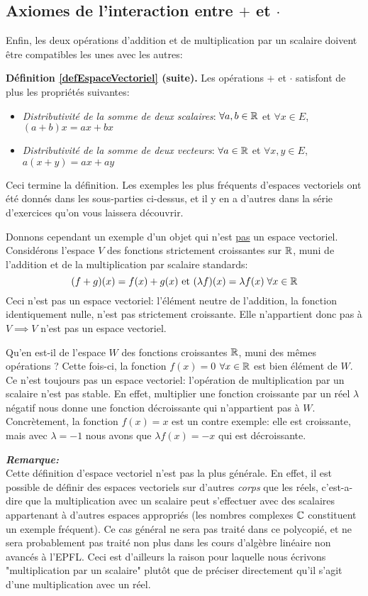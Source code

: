 \subsection{Axiomes de l’interaction entre $+$ et $\cdot$}
Enfin, les deux opérations d'addition et de multiplication par un scalaire doivent être compatibles les unes avec les autres:
\begin{greybox}
\textbf{Définition \ref{defEspaceVectoriel} (suite).} Les opérations $+$ et $\cdot$ satisfont de plus les propriétés suivantes:
\begin{itemize}
    \item \textit{Distributivité de la somme de deux scalaires}: $\forall a,b \in \mathbb{R}$ et $\forall x \in E$, $(a+b)x = ax + bx$
    \item \textit{Distributivité de la somme de deux vecteurs}: $\forall a \in \mathbb{R}$ et $\forall x,y \in E$, $a(x+y) = ax+ay$
\end{itemize}
\end{greybox}

Ceci termine la définition. Les exemples les plus fréquents d'espaces vectoriels ont été donnés dans les sous-parties ci-dessus, et il y en a d'autres dans la série d'exercices qu'on vous laissera découvrir.

Donnons cependant un exemple d'un objet qui n'est \underline{pas} un espace vectoriel. Considérons l'espace $V$ des fonctions strictement croissantes sur $\mathbb{R}$, muni de l'addition et de la multiplication par scalaire standards:
$$(f+g)(x) = f(x) + g(x) \text{ et } (\lambda f)(x) = \lambda f(x) \; \forall x \in \mathbb{R}$$
Ceci n'est pas un espace vectoriel: l'élément neutre de l'addition, la fonction identiquement nulle, n'est pas strictement croissante. Elle n'appartient donc pas à $V \implies V$ n'est pas un espace vectoriel.

Qu'en est-il de l'espace $W$ des fonctions croissantes $\mathbb{R}$, muni des mêmes opérations ? Cette fois-ci, la fonction $f(x) = 0$ $\forall x \in \mathbb{R}$ est bien élément de $W$. Ce n'est toujours pas un espace vectoriel: l'opération de multiplication par un scalaire n'est pas stable. En effet, multiplier une fonction croissante par un réel $\lambda$ négatif nous donne une fonction décroissante qui n'appartient pas à $W$. Concrètement, la fonction $f(x) = x$ est un contre exemple: elle est croissante, mais avec $\lambda = -1$ nous avons que $\lambda f(x) = -x$ qui est décroissante.

\textit{\textbf{Remarque:}} \\
Cette définition d'espace vectoriel n'est pas la plus générale. En effet, il est possible de définir des espaces vectoriels sur d'autres \textit{corps} que les réels, c'est-a-dire que la multiplication avec un scalaire peut s'effectuer avec des scalaires appartenant à d'autres espaces appropriés (les nombres complexes $\mathbb{C}$ constituent un exemple fréquent). Ce cas général ne sera pas traité dans ce polycopié, et ne sera probablement pas traité non plus dans les cours d'algèbre linéaire non avancés à l'EPFL. Ceci est d'ailleurs la raison pour laquelle nous écrivons "multiplication par un scalaire" plutôt que de préciser directement qu'il s'agit d'une multiplication avec un réel.


